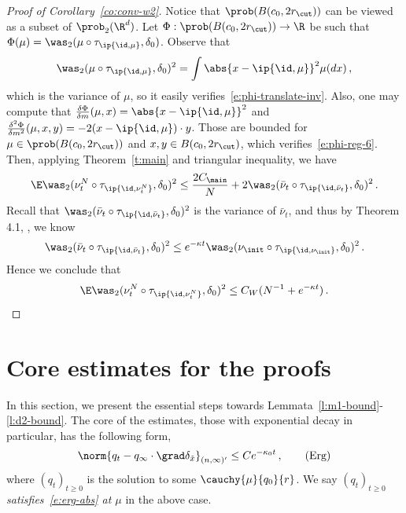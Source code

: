 \documentclass{amsart}
\begin{document}
\begin{proof}[Proof of Corollary~\ref{co:conv-w2}]
    Notice that $\prob(B(c_0, 2r_\cut))$ can be viewed as a subset of $\prob_2(\R^d)$.
    Let $\Phi: \prob(B(c_0, 2r_\cut)) \to \R$ be such that $\Phi(\mu) = \was_2(\mu \circ \tau_{\ip{\id, \mu}}, \delta_0)$. 
    Observe that 
    \begin{equation*}
        \was_2(\mu \circ \tau_{\ip{\id, \mu}}, \delta_0)^2 = \int \abs{x - \ip{\id, \mu}}^2 \mu(dx) \,,
    \end{equation*}
    which is the variance of $\mu$, so it easily verifies~\eqref{e:phi-translate-inv}.
    Also, one may compute that $\frac{\delta \Phi}{\delta m}(\mu,x) = \abs{x - \ip{\id, \mu}}^2$ and $\frac{\delta^2 \Phi}{\delta m^2}(\mu,x,y) = -2 (x-\ip{\id, \mu}) \cdot y$.
    Those are bounded for $\mu \in \prob(B(c_0, 2r_\cut))$ and $x,y \in B(c_0, 2r_\cut)$, which verifies~\eqref{e:phi-reg-6}. 
    Then, applying Theorem~\ref{t:main} and triangular inequality, we have 
    \begin{equation*}
        \E \was_2(\nu^N_t \circ \tau_{\ip{\id, \nu^N_t}}, \delta_0)^2 \le \frac{2C_\main}{N} + 2\was_2(\bar \nu_t \circ \tau_{\ip{\id, \bar \nu_t}}, \delta_0)^2 \,.
    \end{equation*}
    Recall that $\was_2(\bar \nu_t \circ \tau_{\ip{\id, \bar \nu_t}}, \delta_0)^2$ is the variance of $\bar \nu_t$, and thus by Theorem 4.1, \cite{CarriloChoiTotzeckTse2018}, we know 
    \begin{equation*}
        \was_2(\bar \nu_t \circ \tau_{\ip{\id, \bar \nu_t}}, \delta_0)^2 \le e^{-\kappa t} \was_2(\nu_\init \circ \tau_{\ip{\id, \nu_\init}}, \delta_0)^2 \,.
    \end{equation*}
    Hence we conclude that 
    \begin{equation*}
        \E \was_2(\nu^N_t \circ \tau_{\ip{\id, \nu^N_t}}, \delta_0)^2 \le C_W (N^{-1} + e^{-\kappa t}) \,.
    \end{equation*}
\end{proof}





\section{Core estimates for the proofs}
\label{s:core-est}

In this section, we present the essential steps towards Lemmata~\ref{l:m1-bound}-\ref{l:d2-bound}. 
The core of the estimates, those with exponential decay in particular, has the following form,
\begin{equation}
	\label{e:erg-abs}
	\norm{q_t - q_\infty \cdot \grad \delta_{\tilde x}}_{(n,\infty)'} \le C e^{-\kappa_0 t} \,,
	\tag{Erg}
\end{equation}
where $(q_t)_{t \ge 0}$ is the solution to some $\cauchy{\mu}{q_0}{r}$. 
We say $(q_t)_{t \ge 0}$ \emph{satisfies~\eqref{e:erg-abs} at $\mu$} in the above case.
\end{document}
